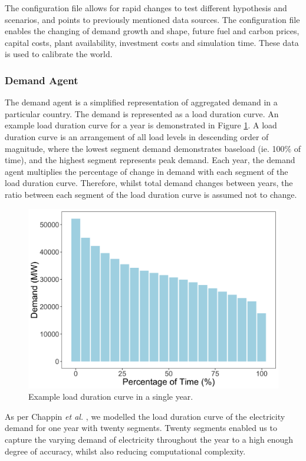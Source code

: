 The configuration file allows for rapid changes to test different hypothesis and scenarios, and points to previously mentioned data sources. The configuration file enables the changing of demand growth and shape,  future fuel and carbon prices, capital costs, plant availability, investment costs and simulation time. These data is used to calibrate the world.

\subsubsection{Demand Agent}
The demand agent is a simplified representation of aggregated demand in a particular country. The demand is represented as a load duration curve. An example load duration curve for a year is demonstrated in Figure \ref{fig:loaddurationcurve}. A load duration curve is an arrangement of all load levels in descending order of magnitude, where the lowest segment demand demonstrates baseload (ie. 100\% of time), and the highest segment represents peak demand. Each year, the demand agent multiplies the percentage of change in demand with each segment of the load duration curve. Therefore, whilst total demand changes between years, the ratio between each segment of the load duration curve is assumed not to change.

\begin{figure}
	\centering
	\includegraphics[width=0.95\linewidth]{figures/load_duration_curve}
	\caption{Example load duration curve in a single year.}
	\label{fig:loaddurationcurve}
\end{figure}

As per Chappin \textit{et al.} \cite{Chappin2017}, we modelled the load duration curve of the electricity demand for one year with twenty segments. Twenty segments enabled us to capture the varying demand of electricity throughout the year to a high enough degree of accuracy, whilst also reducing computational complexity. 


